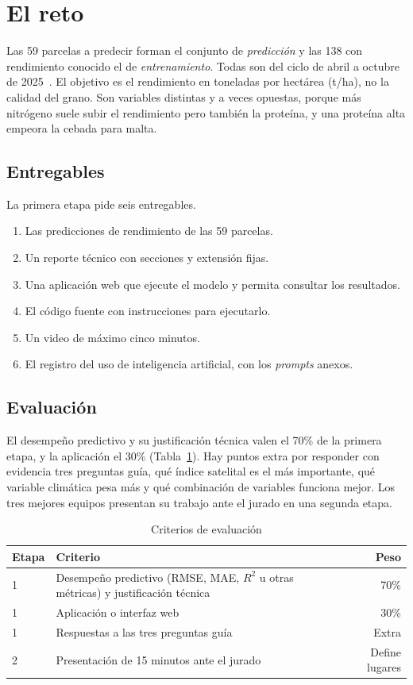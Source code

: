 \section{El reto}\label{sec:reto}
Las 59 parcelas a predecir forman el conjunto de \emph{predicción} y las 138 con rendimiento conocido el de
\emph{entrenamiento}. Todas son del ciclo de abril a octubre de 2025~\cite{bases}. El objetivo es el rendimiento en
toneladas por hectárea (t/ha), no la calidad del grano. Son variables distintas y a veces opuestas, porque más
nitrógeno suele subir el rendimiento pero también la proteína, y una proteína alta empeora la cebada para malta.

\subsection{Entregables}
La primera etapa pide seis entregables.
\begin{enumerate}
  \item Las predicciones de rendimiento de las 59 parcelas.
  \item Un reporte técnico con secciones y extensión fijas.
  \item Una aplicación web que ejecute el modelo y permita consultar los resultados.
  \item El código fuente con instrucciones para ejecutarlo.
  \item Un video de máximo cinco minutos.
  \item El registro del uso de inteligencia artificial, con los \emph{prompts} anexos.
\end{enumerate}

\subsection{Evaluación}
El desempeño predictivo y su justificación técnica valen el 70\% de la primera etapa, y la aplicación el 30\%
(Tabla~\ref{tab:evaluacion}). Hay puntos extra por responder con evidencia tres preguntas guía, qué índice satelital
es el más importante, qué variable climática pesa más y qué combinación de variables funciona mejor. Los tres mejores
equipos presentan su trabajo ante el jurado en una segunda etapa.

\begin{table}[!t]
\caption{Criterios de evaluación}\label{tab:evaluacion}
\centering\footnotesize
\begin{tabularx}{\columnwidth}{@{}lXr@{}}
\toprule
Etapa & Criterio & Peso \\
\midrule
1 & Desempeño predictivo (RMSE, MAE, $R^2$ u otras métricas) y justificación técnica & 70\% \\
1 & Aplicación o interfaz web & 30\% \\
1 & Respuestas a las tres preguntas guía & Extra \\
2 & Presentación de 15 minutos ante el jurado & Define lugares \\
\bottomrule
\end{tabularx}
\end{table}

